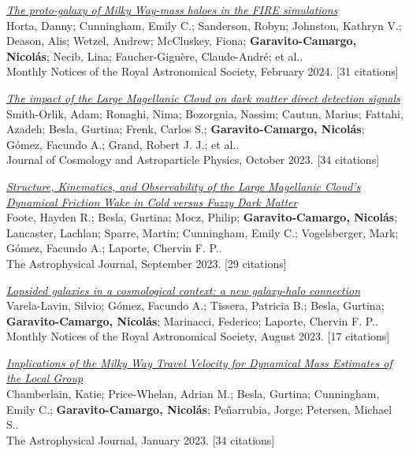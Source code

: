 \documentclass[14pt]{article}
\begin{document}
\begin{etaremune}
\item \textit{\href{https://ui.adsabs.harvard.edu/abs/2024MNRAS.527.9810H/abstract}{The proto-galaxy of Milky Way-mass haloes in the FIRE simulations}}\\
  {\small \color{darkgray} Horta, Danny; Cunningham, Emily C.; Sanderson, Robyn; Johnston, Kathryn V.; Deason, Alis; Wetzel, Andrew; McCluskey, Fiona; \textbf{Garavito-Camargo, Nicolás}; Necib, Lina; Faucher-Giguère, Claude-André; et al..\\
  Monthly Notices of the Royal Astronomical Society, February 2024. [31 citations]}

\item \textit{\href{https://ui.adsabs.harvard.edu/abs/2023JCAP...10..070S/abstract}{The impact of the Large Magellanic Cloud on dark matter direct detection signals}}\\
  {\small \color{darkgray} Smith-Orlik, Adam; Ronaghi, Nima; Bozorgnia, Nassim; Cautun, Marius; Fattahi, Azadeh; Besla, Gurtina; Frenk, Carlos S.; \textbf{Garavito-Camargo, Nicolás}; Gómez, Facundo A.; Grand, Robert J. J.; et al..\\
  Journal of Cosmology and Astroparticle Physics, October 2023. [34 citations]}

\item \textit{\href{https://ui.adsabs.harvard.edu/abs/2023ApJ...954..163F/abstract}{Structure, Kinematics, and Observability of the Large Magellanic Cloud's Dynamical Friction Wake in Cold versus Fuzzy Dark Matter}}\\
  {\small \color{darkgray} Foote, Hayden R.; Besla, Gurtina; Mocz, Philip; \textbf{Garavito-Camargo, Nicolás}; Lancaster, Lachlan; Sparre, Martin; Cunningham, Emily C.; Vogelsberger, Mark; Gómez, Facundo A.; Laporte, Chervin F. P..\\
  The Astrophysical Journal, September 2023. [29 citations]}

\item \textit{\href{https://ui.adsabs.harvard.edu/abs/2023MNRAS.523.5853V/abstract}{Lopsided galaxies in a cosmological context: a new galaxy-halo connection}}\\
  {\small \color{darkgray} Varela-Lavin, Silvio; Gómez, Facundo A.; Tissera, Patricia B.; Besla, Gurtina; \textbf{Garavito-Camargo, Nicolás}; Marinacci, Federico; Laporte, Chervin F. P..\\
  Monthly Notices of the Royal Astronomical Society, August 2023. [17 citations]}

\item \textit{\href{https://ui.adsabs.harvard.edu/abs/2023ApJ...942...18C/abstract}{Implications of the Milky Way Travel Velocity for Dynamical Mass Estimates of the Local Group}}\\
  {\small \color{darkgray} Chamberlain, Katie; Price-Whelan, Adrian M.; Besla, Gurtina; Cunningham, Emily C.; \textbf{Garavito-Camargo, Nicolás}; Peñarrubia, Jorge; Petersen, Michael S..\\
  The Astrophysical Journal, January 2023. [34 citations]}


\end{etaremune}
\end{document}
